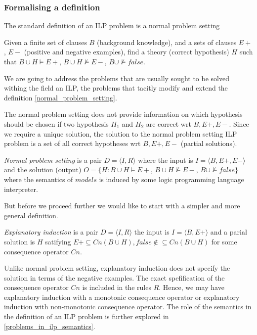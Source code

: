 \subsubsection{Formalising a definition}
The standard definition of an ILP problem is a normal problem setting\cite{nienhuys1997foundations}
\begin{defn}\label{normal_problem_setting}
Given a finite set of clauses $B$ (background knowledge),
and a sets of clauses $E+$, $E-$ (positive and negative examples),
find a theory (correct hypothesis) $H$ such that $B \cup H \models E+$,
$B \cup H \not\models E-$, $B \cup \not\models false$.
\end{defn}

We are going to address the problems that are usually sought to be solved withing the field an ILP, the problems that tacitly modify and extend the definition \ref{normal_problem_setting}.

The normal problem setting does not provide information on which hypothesis should be chosen if two hypothesis $H_1$ and $H_2$ are correct wrt $B, E+, E-$. Since we require a unique solution, the solution to the normal problem setting ILP problem is a set of all correct hypotheses wrt $B, E+, E-$ (partial solutions).
\begin{defn}
\emph{Normal problem setting} is a pair $D=\langle I, R \rangle$ where
the input is $I=\langle B, E+, E- \rangle$ and the solution (output)
$O=\{ H : B \cup H \models E+$, $B \cup H \not\models E-$, $B \cup \not\models false \}$ where the semantics of $models$ is induced by some logic programming language interpreter.
\end{defn}

But before we proceed further we would like to start with a simpler and more general definition.
\begin{defn}
\emph{Explanatory induction}\cite{yamamoto2012inverse} is a pair $D=\langle I, R \rangle$
the input is $I=\langle B, E+ \rangle$ and a parial solution is $H$ satifying
$E+ \subseteq Cn(B \cup H), false \not\in \subseteq Cn(B \cup H)$ for some consequence operator $Cn$.
\end{defn}
Unlike normal problem setting, explanatory induction does not specify the solution in terms of the negative examples. The exact spefification of the consequence operator $Cn$ is included in the rules $R$. Hence, we may have explanatory induction with a monotonic consequence operator or explanatory induction with non-monotonic consequence operator. The role of the semantics in the definition of an ILP problem is further explored in \ref{problems_in_ilp_semantics}.

